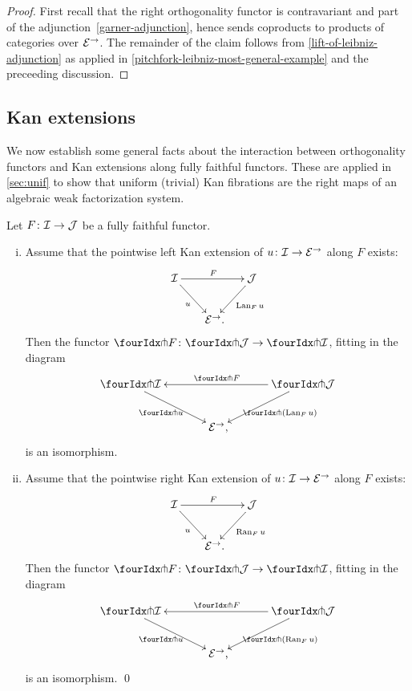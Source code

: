 \documentclass[reqno,10pt,a4paper,oneside,draft]{amsart}
\begin{document}
\begin{proof}
First recall that the right orthogonality functor is contravariant and part of the adjunction~\eqref{garner-adjunction}, hence sends coproducts to products of categories over $\mathcal{E}^\to$.
The remainder of the claim follows from \cref{lift-of-leibniz-adjunction} as applied in \cref{pitchfork-leibniz-most-general-example} and the preceeding discussion.
\end{proof}

\subsection*{Kan extensions}

We now establish some general facts about the interaction between orthogonality functors and Kan extensions along fully faithful functors.
These are applied in \cref{sec:unif} to show that uniform (trivial) Kan fibrations are the right maps of an algebraic weak factorization system.

\begin{proposition} \label{kan-extension-closure}
Let $F \colon \mathcal{I} \to \mathcal{J}$ be a fully faithful functor.
\begin{enumerate}[(i)]
\item Assume that the pointwise left Kan extension of $u \colon \mathcal{I} \to \mathcal{E}^\to$ along $F$ exists:
\[
\xymatrix@!C@C-1em{
  \cal{I}
  \ar[dr]_{u}
  \ar[rr]^{F}
&&
  \cal{J}
  \ar[dl]^{\Lan_F u}
\\&
  \catE^\to
\rlap{.}}
\]
Then the functor $\liftr{F} \co \liftr{\cal{J}} \to \liftr{\cal{I}}$, fitting in the diagram
\[
\xymatrix@!C@C-1em{
  \liftr{\cal{I}}
  \ar[dr]_{\liftr{u}}
&&
  \liftr{\cal{J}}
  \ar[ll]_{\liftr{F}}
  \ar[dl]^{\liftr{(\Lan_F u)}}
\\&
  \catE^\to
\rlap{,}}
\]
is an isomorphism.
\item Assume that the pointwise right Kan extension of $u \colon \mathcal{I} \to \mathcal{E}^\to$ along $F$ exists:
\[
\xymatrix@!C@C-1em{
  \cal{I}
  \ar[dr]_{u}
  \ar[rr]^{F}
&&
  \cal{J}
  \ar[dl]^{\Ran_F u}
\\&
  \catE^\to
\rlap{.}}
\]
Then the functor $\liftl{F} \co \liftl{\cal{J}} \to \liftl{\cal{I}}$, fitting in the diagram
\[
\xymatrix@!C@C-1em{
  \liftl{\cal{I}}
  \ar[dr]_{\liftl{u}}
&&
  \liftl{\cal{J}}
  \ar[ll]_{\liftl{F}}
  \ar[dl]^{\liftl{(\Ran_F u)}}
\\&
  \catE^\to
\rlap{,}}
\]
is an isomorphism.
\qed
\end{enumerate}
\end{proposition}
\end{document}
